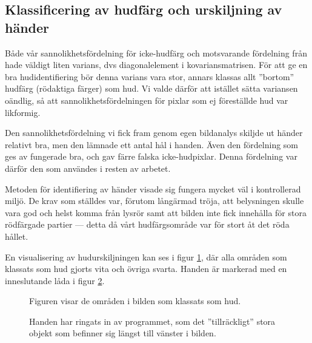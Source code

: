 \documentclass[../rapport_MVEX01-11-05]{subfiles}
\begin{document}
\subsection{Klassificering av hudfärg och urskiljning av händer}
Både vår sannolikhetsfördelning för icke-hudfärg och motsvarande
fördelning från  hade väldigt liten varians,
dvs diagonalelement i kovariansmatrisen. För att ge en bra
hudidentifiering bör denna varians vara stor, annars klassas allt
''bortom'' hudfärg (rödaktiga färger) som hud. Vi valde därför att
istället sätta variansen oändlig, så att sannolikhetsfördelningen för
pixlar som ej föreställde hud var likformig.

Den sannolikhetsfördelning vi fick fram genom egen bildanalys skiljde
ut händer relativt bra, men den lämnade ett antal hål i handen. Även
den fördelning som ges av  fungerade bra, och
gav färre falska icke-hudpixlar. Denna fördelning var därför den som
användes i resten av arbetet. 

Metoden för identifiering av händer visade sig fungera mycket väl i
kontrollerad miljö. De krav som ställdes var, förutom långärmad
tröja, att belysningen skulle vara god och helst komma från lysrör
samt att bilden inte fick innehålla för stora rödfärgade partier --- detta
då vårt hudfärgsområde var för stort åt det röda hållet. 

En visualisering av hudurskiljningen kan ses i figur
\ref{fig:hudklassificering}, där alla områden som klassats som hud
gjorts vita och övriga svarta. Handen är markerad med en inneslutande
låda i figur \ref{fig:boundingbox}.

\begin{figure}
	  \centering
		\caption{Figuren visar de områden i bilden som
                  klassats som hud.}
									\label{fig:hudklassificering}
\end{figure}

\begin{figure}
	  \centering
		\caption{Handen har ringats in av programmet, som det
                  ''tillräckligt'' stora objekt som befinner sig
                  längst till vänster i bilden.}
									\label{fig:boundingbox}
\end{figure}
\end{document}
